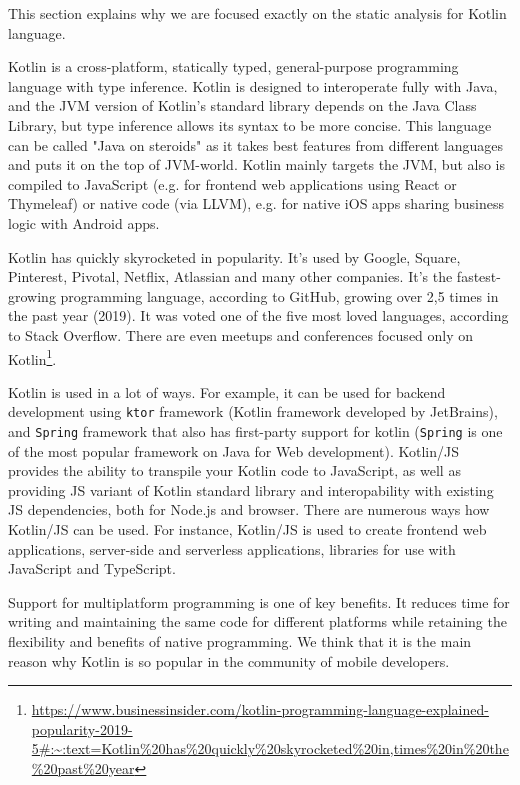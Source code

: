 This section explains why we are focused exactly on the static analysis for Kotlin language.

Kotlin is a cross-platform, statically typed, general-purpose programming language with type inference. Kotlin is designed to interoperate fully with Java, and the JVM version of Kotlin's standard library depends on the Java Class Library, but type inference allows its syntax to be more concise. This language can be called "Java on steroids" as it takes best features from different languages and puts it on the top of JVM-world. Kotlin mainly targets the JVM, but also is compiled to JavaScript (e.g. for frontend web applications using React or Thymeleaf) or native code (via LLVM), e.g. for native iOS apps sharing business logic with Android apps. %

Kotlin has quickly skyrocketed in popularity. It's used by Google, Square, Pinterest, Pivotal, Netflix, Atlassian and many other companies. It's the fastest-growing programming language, according to GitHub, growing over 2,5 times in the past year (2019). It was voted one of the five most loved languages, according to Stack Overflow. There are even meetups and conferences focused only on Kotlin\footnote{\url{https://www.businessinsider.com/kotlin-programming-language-explained-popularity-2019-5\#:\~:text=Kotlin\%20has\%20quickly\%20skyrocketed\%20in,times\%20in\%20the\%20past\%20year}}.

Kotlin is used in a lot of ways. For example, it can be used for backend development using \texttt{ktor} framework (Kotlin framework developed by JetBrains), and  \texttt{Spring} framework that also has first-party support for kotlin (\texttt{Spring} is one of the most popular framework on Java for Web development). Kotlin/JS provides the ability to transpile your Kotlin code to JavaScript, as well as providing JS variant of Kotlin standard library and interopability with existing JS dependencies, both for Node.js and browser. There are numerous ways how Kotlin/JS can be used. For instance, Kotlin/JS is used to create frontend web applications, server-side and serverless applications, libraries for use with JavaScript and TypeScript.

Support for multiplatform programming is one of key benefits. It reduces time for writing and maintaining the same code for different platforms while retaining the flexibility and benefits of native programming. We think that it is the main reason why Kotlin is so popular in the community of mobile developers.

